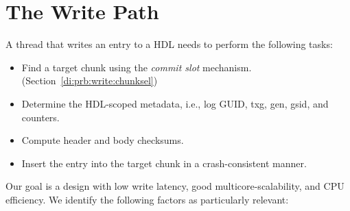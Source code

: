 \documentclass[12pt,a4paper,twoside]{book}
\begin{document}
\section{The Write Path}\label{di:prb:write}
A thread that writes an entry to a HDL needs to perform the following tasks:
\begin{itemize}[noitemsep]
    \item Find a target chunk using the \textit{commit slot} mechanism. (Section~\ref{di:prb:write:chunksel})
    \item Determine the HDL-scoped metadata, i.e., log GUID, txg, gen, gsid, and counters.
    \item Compute header and body checksums.
    \item Insert the entry into the target chunk in a crash-consistent manner.
\end{itemize}
Our goal is a design with low write latency, good multicore-scalability, and CPU efficiency.
We identify the following factors as particularly relevant:
\end{document}
